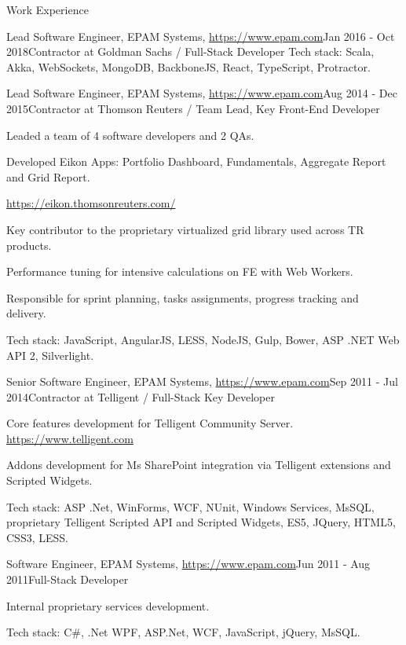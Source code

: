 \documentclass{resume}
\begin{document}
\begin{rSection}{Work Experience}
\begin{rSubsection}{Lead Software Engineer, EPAM Systems, \url{https://www.epam.com}}{Jan 2016 - Oct 2018}{Contractor at Goldman Sachs / Full-Stack Developer}{}
Tech stack: Scala, Akka, WebSockets, MongoDB, BackboneJS, React, TypeScript, Protractor.
\end{rSubsection}


\begin{rSubsection}{Lead Software Engineer, EPAM Systems, \url{https://www.epam.com}}{Aug 2014 - Dec 2015}{Contractor at Thomson Reuters / Team Lead, Key Front-End Developer}{}
\item Leaded a team of 4 software developers and 2 QAs.
\item Developed Eikon Apps: Portfolio Dashboard, Fundamentals, Aggregate Report and Grid Report.
\item[] \url{https://eikon.thomsonreuters.com/}
\item Key contributor to the proprietary virtualized grid library used across TR products.
\item Performance tuning for intensive calculations on FE with Web Workers.
\item Responsible for sprint planning, tasks assignments, progress tracking and delivery.

Tech stack: JavaScript, AngularJS, LESS, NodeJS, Gulp, Bower, ASP .NET Web API 2, Silverlight.
\end{rSubsection}

\begin{rSubsection}{Senior Software Engineer, EPAM Systems, \url{https://www.epam.com}}{Sep 2011 - Jul 2014}{Contractor at Telligent / Full-Stack Key Developer}{}
\item Core features development for Telligent Community Server. \url{https://www.telligent.com}
\item Addons development for Ms SharePoint integration via Telligent extensions and Scripted Widgets.

Tech stack:  ASP .Net, WinForms, WCF, NUnit, Windows Services, MsSQL, proprietary Telligent Scripted API and Scripted Widgets, ES5, JQuery, HTML5, CSS3, LESS.
\end{rSubsection}


\begin{rSubsection}{Software Engineer, EPAM Systems, \url{https://www.epam.com}}{Jun 2011 - Aug 2011}{Full-Stack Developer}{}
\item Internal proprietary services development.

Tech stack: C\#, .Net WPF, ASP.Net, WCF, JavaScript, jQuery, MsSQL.
\end{rSubsection}

\end{rSection}
\end{document}
